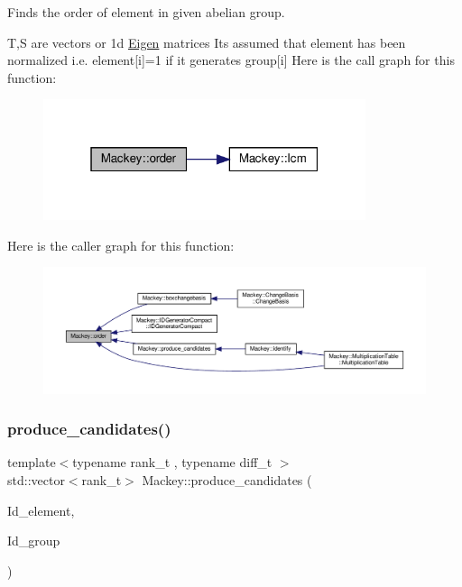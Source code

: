 Finds the order of element in given abelian group. 

T,S are vectors or 1d \hyperlink{namespaceEigen}{Eigen} matrices It\textquotesingle{}s assumed that element has been normalized i.\+e. element\mbox{[}i\mbox{]}=1 if it generates group\mbox{[}i\mbox{]} Here is the call graph for this function\+:\nopagebreak
\begin{figure}[H]
\begin{center}
\leavevmode
\includegraphics[width=268pt]{namespaceMackey_a4abdca157edcf425b1e7ceff39d74c2f_cgraph}
\end{center}
\end{figure}
Here is the caller graph for this function\+:\nopagebreak
\begin{figure}[H]
\begin{center}
\leavevmode
\includegraphics[width=350pt]{namespaceMackey_a4abdca157edcf425b1e7ceff39d74c2f_icgraph}
\end{center}
\end{figure}
\mbox{\label{namespaceMackey_a417d303e187dac5a1a2c2c02c6267758}} 
\subsubsection{\texorpdfstring{produce\+\_\+candidates()}{produce\_candidates()}}
{\footnotesize\ttfamily template$<$typename rank\+\_\+t , typename diff\+\_\+t $>$ \\
std\+::vector$<$rank\+\_\+t$>$ Mackey\+::produce\+\_\+candidates (\begin{DoxyParamCaption}\item[{const \hyperlink{classMackey_1_1IDGeneratorCompact}{I\+D\+Generator\+Compact}$<$ rank\+\_\+t, diff\+\_\+t $>$ \&}]{Id\+\_\+element,  }\item[{const \hyperlink{classMackey_1_1IDGenerators}{I\+D\+Generators}$<$ rank\+\_\+t, diff\+\_\+t $>$ \&}]{Id\+\_\+group }\end{DoxyParamCaption})}




